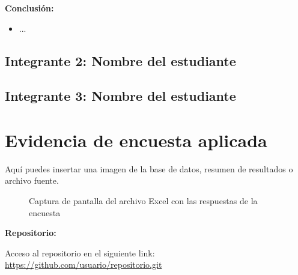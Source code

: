 \documentclass[12pt, a4paper]{article}
\begin{document}
\textbf{Conclusión:}
\begin{itemize}
    \item ...
\end{itemize}

\newpage
\subsection*{Integrante 2: Nombre del estudiante}


\newpage
\subsection*{Integrante 3: Nombre del estudiante}


\section{Evidencia de encuesta aplicada}
Aquí puedes insertar una imagen de la base de datos, resumen de resultados o archivo fuente.

\begin{figure}[H]
    \centering
    \caption{Captura de pantalla del archivo Excel con las respuestas de la encuesta}
\end{figure}


\textbf{Repositorio:}  
\label{anexo:repositorio}

Acceso al repositorio en el siguiente link:  
\url{https://github.com/usuario/repositorio.git}
\end{document}
